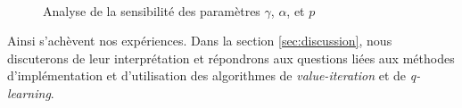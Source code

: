 \documentclass{article}
\begin{document}
\begin{figure}[H]
    \centering
     \\
    \hfill
    \caption{Analyse de la sensibilité des paramètres $\gamma$, $\alpha$, et $p$}
    \label{fig:sensibility_analysis}
\end{figure}

\noindent Ainsi s’achèvent nos expériences. Dans la section \ref{sec:discussion}, nous discuterons de leur interprétation et répondrons aux questions liées aux méthodes d’implémentation et d’utilisation des algorithmes de \textit{value-iteration} et de \textit{q-learning}.
\end{document}
